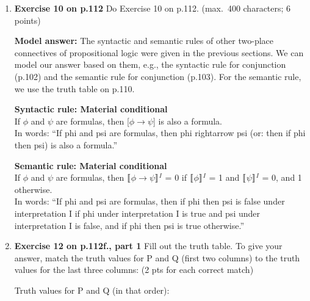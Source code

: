 \documentclass[a4,11pt]{article}
\newcommand{\6}{\mbox{$[\hspace*{-.6mm}[$}}
\newcommand{\9}{\mbox{$]\hspace*{-.6mm}]$}}
\newcommand{\sem}[2]{\6#1\9$^{#2}$}
\begin{document}
\begin{enumerate}[leftmargin = 12pt]
\begin{enumerate}
\item p or if q then r

\item p or if not q then r

\end{enumerate}

{ \bf Model answer:} (a) matches (a), (b) matches (b), (c) matches (c) and (d) matches (d). Note that the English sentences do not necessarily disambiguate the logic sentences: for instance, an utterance of ``if p then q or r'' would be the way to say both $p \rightarrow (q \vee r)$ and $(p \rightarrow q) \vee r$. If we really want to disambiguate the logic sentences, we would have to also mention the parentheses, e.g., ``if p then open parentheses q or r closed parentheses''.

\item {\bf  Exercise 10 on p.112} Do Exercise 10 on p.112. (max.\ 400 characters; 6 points)

{ \bf Model answer:}  The syntactic and semantic rules of other two-place connectives of propositional logic were given in the previous sections. We can model our answer based on them, e.g., the syntactic rule for conjunction (p.102) and the semantic rule for conjunction (p.103). For the semantic rule, we use the truth table on p.110. 

{\bf Syntactic rule: Material conditional}
\\ If $\phi$ and $\psi$ are formulas, then [$\phi \rightarrow \psi$] is also a formula. 
\\ In words: ``If phi and psi are formulas, then phi rightarrow psi (or: then if phi then psi) is also a formula.''

{\bf Semantic rule: Material conditional}
\\ If $\phi$ and $\psi$ are formulas, then \sem{$\phi \rightarrow \psi$}{I} = 0 if \sem{$\phi$}{I} = 1 and \sem{$\psi$}{I} = 0, and 1 otherwise.
\\ In words: ``If phi and psi are formulas, then if phi then psi is false under interpretation I if phi under interpretation I is true and psi under interpretation I is false, and if phi then psi is true otherwise.''


\item {\bf  Exercise 12 on p.112f., part 1} Fill out the truth table. To give your answer, match the truth values for P and Q (first two columns) to the truth values for the last three columns: (2 pts for each correct match)

Truth values for P and Q (in that order):


\end{enumerate}
\end{document}
